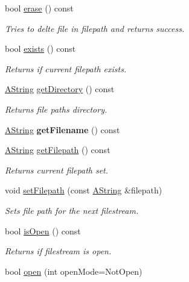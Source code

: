 \begin{DoxyCompactItemize}
bool \mbox{\hyperlink{class_file_ad1eb2efb9d067dded30d4ef54eb307d1}{erase}} () const
\begin{DoxyCompactList}\small\item\em Tries to delte file in filepath and returns success. \end{DoxyCompactList}\item 
bool \mbox{\hyperlink{class_file_a53118ce36851cb1c6845a82f915fd8ba}{exists}} () const
\begin{DoxyCompactList}\small\item\em Returns if current filepath exists. \end{DoxyCompactList}\item 
\mbox{\hyperlink{class_a_string}{A\+String}} \mbox{\hyperlink{class_file_ac3770227bca4efa56a4d3a33fe83fa8e}{get\+Directory}} () const
\begin{DoxyCompactList}\small\item\em Returns file path\textquotesingle{}s directory. \end{DoxyCompactList}\item 
\mbox{\label{class_file_a953668209fb0f4c62093ae2c31475902}} 
\mbox{\hyperlink{class_a_string}{A\+String}} {\bfseries get\+Filename} () const
\item 
\mbox{\hyperlink{class_a_string}{A\+String}} \mbox{\hyperlink{class_file_a033178594e2a60e489d7ab2936676e90}{get\+Filepath}} () const
\begin{DoxyCompactList}\small\item\em Returns current filepath set. \end{DoxyCompactList}\item 
void \mbox{\hyperlink{class_file_ae5b50c42cb117914a87347461b4bfb56}{set\+Filepath}} (const \mbox{\hyperlink{class_a_string}{A\+String}} \&filepath)
\begin{DoxyCompactList}\small\item\em Sets file path for the next filestream. \end{DoxyCompactList}\item 
bool \mbox{\hyperlink{class_file_abb0ce5b71ecf6fbaa538a812a622fc10}{is\+Open}} () const
\begin{DoxyCompactList}\small\item\em Returns if filestream is open. \end{DoxyCompactList}\item 
bool \mbox{\hyperlink{class_file_a0e9dcaeac1036345bf15d941a6989caf}{open}} (int open\+Mode=Not\+Open)

\end{DoxyCompactItemize}
